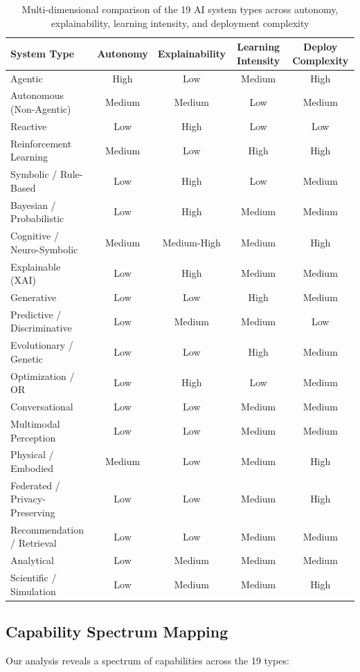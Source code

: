 \documentclass[acmsmall,screen,review]{acmart}
\begin{document}
\begin{table}[ht]
  \caption{Multi-dimensional comparison of the 19 AI system types across autonomy, explainability, learning intensity, and deployment complexity}
  \label{tab:comparison}
  \small
  \begin{tabular}{lcccc}
    \toprule
    \textbf{System Type} & \textbf{Autonomy} & \textbf{Explainability} & \textbf{Learning Intensity} & \textbf{Deploy Complexity} \\
    \midrule
    Agentic & High & Low & Medium & High \\
    Autonomous (Non-Agentic) & Medium & Medium & Low & Medium \\
    Reactive & Low & High & Low & Low \\
    Reinforcement Learning & Medium & Low & High & High \\
    Symbolic / Rule-Based & Low & High & Low & Medium \\
    Bayesian / Probabilistic & Low & High & Medium & Medium \\
    Cognitive / Neuro-Symbolic & Medium & Medium-High & Medium & High \\
    Explainable (XAI) & Low & High & Medium & Medium \\
    Generative & Low & Low & High & Medium \\
    Predictive / Discriminative & Low & Medium & Medium & Low \\
    Evolutionary / Genetic & Low & Low & High & Medium \\
    Optimization / OR & Low & High & Low & Medium \\
    Conversational & Low & Low & Medium & Medium \\
    Multimodal Perception & Low & Low & Medium & Medium \\
    Physical / Embodied & Medium & Low & Medium & High \\
    Federated / Privacy-Preserving & Low & Low & Medium & High \\
    Recommendation / Retrieval & Low & Low & Medium & Medium \\
    Analytical & Low & Medium & Medium & Medium \\
    Scientific / Simulation & Low & Medium & Medium & High \\
    \bottomrule
  \end{tabular}
\end{table}

\subsection{Capability Spectrum Mapping}
Our analysis reveals a spectrum of capabilities across the 19 types:
\end{document}
